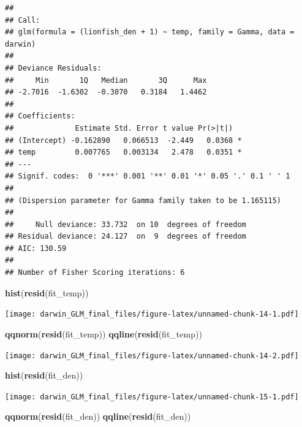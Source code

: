 \documentclass[]{article}
\newenvironment{Shaded}{\begin{snugshade}}{\end{snugshade}}
\newcommand{\KeywordTok}[1]{\textcolor[rgb]{0.13,0.29,0.53}{\textbf{#1}}}
\newcommand{\NormalTok}[1]{#1}
\begin{document}
\begin{verbatim}
## 
## Call:
## glm(formula = (lionfish_den + 1) ~ temp, family = Gamma, data = darwin)
## 
## Deviance Residuals: 
##     Min       1Q   Median       3Q      Max  
## -2.7016  -1.6302  -0.3070   0.3184   1.4462  
## 
## Coefficients:
##              Estimate Std. Error t value Pr(>|t|)  
## (Intercept) -0.162890   0.066513  -2.449   0.0368 *
## temp         0.007765   0.003134   2.478   0.0351 *
## ---
## Signif. codes:  0 '***' 0.001 '**' 0.01 '*' 0.05 '.' 0.1 ' ' 1
## 
## (Dispersion parameter for Gamma family taken to be 1.165115)
## 
##     Null deviance: 33.732  on 10  degrees of freedom
## Residual deviance: 24.127  on  9  degrees of freedom
## AIC: 130.59
## 
## Number of Fisher Scoring iterations: 6
\end{verbatim}

\begin{Shaded}
\begin{Highlighting}[]
\KeywordTok{hist}\NormalTok{(}\KeywordTok{resid}\NormalTok{(fit_temp))}
\end{Highlighting}
\end{Shaded}

\texttt{[image: darwin\_GLM\_final\_files/figure-latex/unnamed-chunk-14-1.pdf]}

\begin{Shaded}
\begin{Highlighting}[]
\KeywordTok{qqnorm}\NormalTok{(}\KeywordTok{resid}\NormalTok{(fit_temp)) }
\KeywordTok{qqline}\NormalTok{(}\KeywordTok{resid}\NormalTok{(fit_temp))}
\end{Highlighting}
\end{Shaded}

\texttt{[image: darwin\_GLM\_final\_files/figure-latex/unnamed-chunk-14-2.pdf]}

\begin{Shaded}
\begin{Highlighting}[]
\KeywordTok{hist}\NormalTok{(}\KeywordTok{resid}\NormalTok{(fit_den))}
\end{Highlighting}
\end{Shaded}

\texttt{[image: darwin\_GLM\_final\_files/figure-latex/unnamed-chunk-15-1.pdf]}

\begin{Shaded}
\begin{Highlighting}[]
\KeywordTok{qqnorm}\NormalTok{(}\KeywordTok{resid}\NormalTok{(fit_den))}
\KeywordTok{qqline}\NormalTok{(}\KeywordTok{resid}\NormalTok{(fit_den))}
\end{Highlighting}
\end{Shaded}
\end{document}

